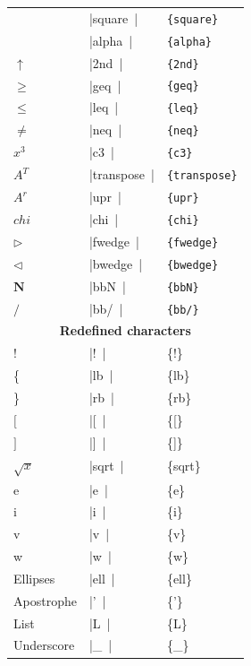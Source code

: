 \documentclass[a4paper,12pt]{article}
\newcommand{\LCDsymb}[1]{\large \textLCD{1}|{#1}~|}
\begin{document}
\begin{center}
\begin{longtable}{|l|l|l|}
		                 & \LCDsymb{square}    & \verb|{square}| \\
		                 & \LCDsymb{alpha}     & \verb|{alpha}| \\
		$\uparrow$       & \LCDsymb{2nd}       & \verb|{2nd}| \\
		$\geq$           & \LCDsymb{geq}       & \verb|{geq}| \\
		$\leq$           & \LCDsymb{leq}       & \verb|{leq}| \\
		$\neq$           & \LCDsymb{neq}       & \verb|{neq}| \\
		$x^3$            & \LCDsymb{c3}        & \verb|{c3}| \\
		$A^T$            & \LCDsymb{transpose} & \verb|{transpose}| \\
		$A^r$            & \LCDsymb{upr}       & \verb|{upr}| \\
		$chi$            & \LCDsymb{chi}       & \verb|{chi}| \\
		$\triangleright$ & \LCDsymb{fwedge}    & \verb|{fwedge}| \\
		$\triangleleft$  & \LCDsymb{bwedge}    & \verb|{bwedge}| \\
		$\mathbf{N}$     & \LCDsymb{bbN}       & \verb|{bbN}| \\
		$\mathbf{/}$     & \LCDsymb{bb/}       & \verb|{bb/}| \\
		\hline
		\multicolumn{3}{c}{\textbf{Redefined characters}} \\
		\hline
		!                & \LCDsymb{!}         & \{!\} \\
		\{               & \LCDsymb{lb}        & \{lb\} \\
		\}               & \LCDsymb{rb}        & \{rb\} \\
		$[$              & \LCDsymb{[}         & \{[\} \\
		$]$              & \LCDsymb{]}         & \{]\} \\
		$\sqrt{x}$       & \LCDsymb{sqrt}      & \{sqrt\} \\
		e                & \LCDsymb{e}         & \{e\} \\
		i                & \LCDsymb{i}         & \{i\} \\
		v                & \LCDsymb{v}         & \{v\} \\
		w                & \LCDsymb{w}         & \{w\} \\
		Ellipses         & \LCDsymb{ell}       & \{ell\} \\
		Apostrophe       & \LCDsymb{'}         & \{'\} \\
		List             & \LCDsymb{L}         & \{L\} \\
		Underscore       & \LCDsymb{_}         & \{\_\} \\
		\hline
	\end{longtable}
\end{center}
\end{document}
